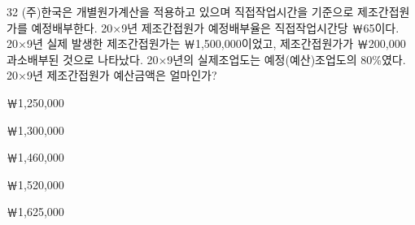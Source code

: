 \begin{question}{32}
(주)한국은 개별원가계산을 적용하고 있으며 직접작업시간을 기준으로 제조간접원가를 예정배부한다. 20×9년 제조간접원가 예정배부율은 직접작업시간당 ￦65이다. 20×9년 실제 발생한 제조간접원가는 ￦1,500,000이었고, 제조간접원가가 ￦200,000 과소배부된 것으로 나타났다. 20×9년의 실제조업도는 예정(예산)조업도의 80\%였다. 20×9년 제조간접원가 예산금액은 얼마인가?
\begin{choices}
  \item ￦1,250,000
  \item ￦1,300,000
  \item ￦1,460,000
  \item ￦1,520,000
  \item ￦1,625,000
\end{choices}
\end{question}
